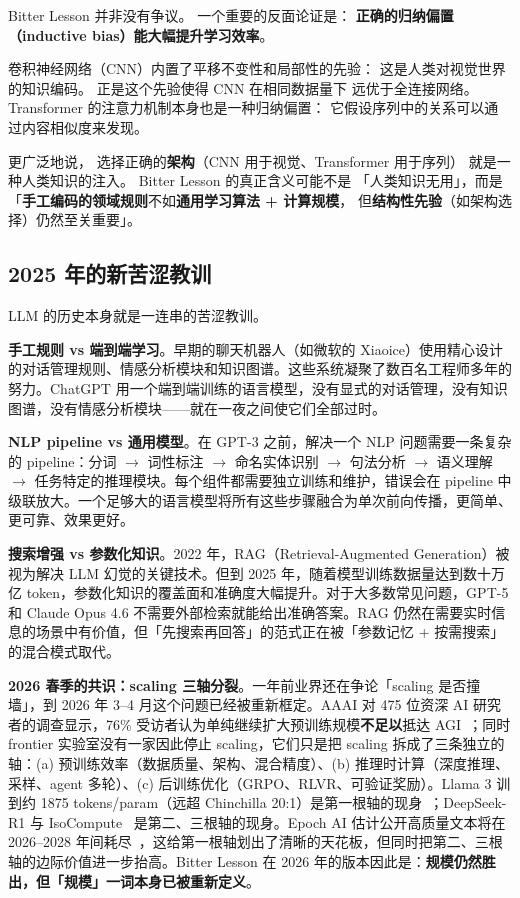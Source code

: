 Bitter Lesson 并非没有争议。
一个重要的反面论证是：
\textbf{正确的归纳偏置（inductive bias）能大幅提升学习效率}。

卷积神经网络（CNN）内置了平移不变性和局部性的先验：
这是人类对视觉世界的知识编码。
正是这个先验使得 CNN 在相同数据量下
远优于全连接网络。
Transformer 的注意力机制本身也是一种归纳偏置：
它假设序列中的关系可以通过内容相似度来发现。

更广泛地说，
选择正确的\textbf{架构}（CNN 用于视觉、Transformer 用于序列）
就是一种人类知识的注入。
Bitter Lesson 的真正含义可能不是
「人类知识无用」，而是
「\textbf{手工编码的领域规则}不如\textbf{通用学习算法 + 计算规模}，
但\textbf{结构性先验}（如架构选择）仍然至关重要」。

\subsection{2025 年的新苦涩教训}

LLM 的历史本身就是一连串的苦涩教训。

\textbf{手工规则 vs 端到端学习}。早期的聊天机器人（如微软的 Xiaoice）使用精心设计的对话管理规则、情感分析模块和知识图谱。这些系统凝聚了数百名工程师多年的努力。ChatGPT 用一个端到端训练的语言模型，没有显式的对话管理，没有知识图谱，没有情感分析模块——就在一夜之间使它们全部过时。

\textbf{NLP pipeline vs 通用模型}。在 GPT-3 之前，解决一个 NLP 问题需要一条复杂的 pipeline：分词 $\to$ 词性标注 $\to$ 命名实体识别 $\to$ 句法分析 $\to$ 语义理解 $\to$ 任务特定的推理模块。每个组件都需要独立训练和维护，错误会在 pipeline 中级联放大。一个足够大的语言模型将所有这些步骤融合为单次前向传播，更简单、更可靠、效果更好。

\textbf{搜索增强 vs 参数化知识}。2022 年，RAG（Retrieval-Augmented Generation）被视为解决 LLM 幻觉的关键技术。但到 2025 年，随着模型训练数据量达到数十万亿 token，参数化知识的覆盖面和准确度大幅提升。对于大多数常见问题，GPT-5 和 Claude Opus 4.6 不需要外部检索就能给出准确答案。RAG 仍然在需要实时信息的场景中有价值，但「先搜索再回答」的范式正在被「参数记忆 + 按需搜索」的混合模式取代。

\textbf{2026 春季的共识：scaling 三轴分裂}。一年前业界还在争论「scaling 是否撞墙」，到 2026 年 3--4 月这个问题已经被重新框定。AAAI 对 475 位资深 AI 研究者的调查显示，76\% 受访者认为单纯继续扩大预训练规模\textbf{不足以}抵达 AGI~\cite{aaai2026survey}；同时 frontier 实验室没有一家因此停止 scaling，它们只是把 scaling 拆成了三条独立的轴：(a) 预训练效率（数据质量、架构、混合精度）、(b) 推理时计算（深度推理、采样、agent 多轮）、(c) 后训练优化（GRPO、RLVR、可验证奖励）。Llama 3 训到约 1875 tokens/param（远超 Chinchilla 20:1）是第一根轴的现身~\cite{roberts2026t2}；DeepSeek-R1 与 IsoCompute~\cite{shen2026isocompute} 是第二、三根轴的现身。Epoch AI 估计公开高质量文本将在 2026--2028 年间耗尽~\cite{epochai2026data}，这给第一根轴划出了清晰的天花板，但同时把第二、三根轴的边际价值进一步抬高。Bitter Lesson 在 2026 年的版本因此是：\textbf{规模仍然胜出，但「规模」一词本身已被重新定义}。

